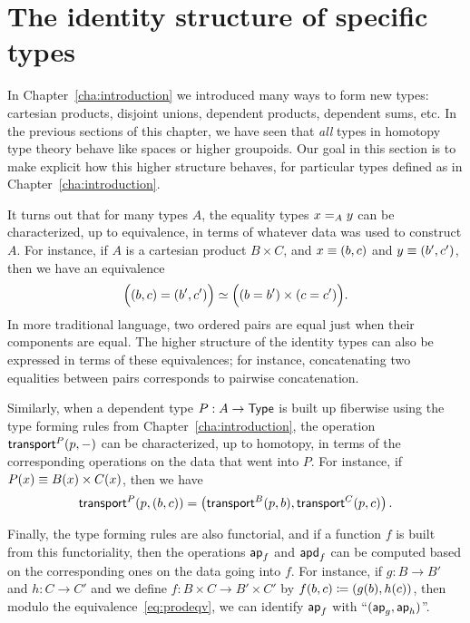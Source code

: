 \newcommand\ua[1]{\ensuremath{\mathsf{ua}} \: #1}

\section{The identity structure of specific types}
\label{sec:computational}

In Chapter~\ref{cha:introduction} we introduced many ways to form new types: cartesian products, disjoint unions, dependent products, dependent sums, etc.
In the previous sections of this chapter, we have seen that \emph{all} types in homotopy type theory behave like spaces or higher groupoids.
Our goal in this section is to make explicit how this higher structure behaves, for particular types defined as in Chapter~\ref{cha:introduction}.

It turns out that for many types $A$, the equality types $\id[A]xy$ can be characterized, up to equivalence, in terms of whatever data was used to construct $A$.
For instance, if $A$ is a cartesian product $B\times C$, and $x\jdeq (b,c)$ and $y\jdeq(b',c')$, then we have an equivalence
\begin{equation}\label{eq:prodeqv}
  \eqv{\Big((b,c)=(b',c')\Big)}{\Big((b=b')\times (c=c')\Big)}.
\end{equation}
In more traditional language, two ordered pairs are equal just when their components are equal.
The higher structure of the identity types can also be expressed in terms of these equivalences; for instance, concatenating two equalities between pairs corresponds to pairwise concatenation.

Similarly, when a dependent type $P:A\to\type$ is built up fiberwise using the type forming rules from Chapter~\ref{cha:introduction}, the operation $\transfib{P}{p}{-}$ can be characterized, up to homotopy, in terms of the corresponding operations on the data that went into $P$.
For instance, if $P(x) \jdeq B(x)\times C(x)$, then we have
\[\transfib{P}{p}{(b,c)} = \left(\transfib{B}{p}{b},\transfib{C}{p}{c}\right).\]

Finally, the type forming rules are also functorial, and if a function $f$ is built from this functoriality, then the operations $\apfunc f$ and $\apdfunc f$ can be computed based on the corresponding ones on the data going into $f$.
For instance, if $g:B\to B'$ and $h:C\to C'$ and we define $f:B\times C \to B'\times C'$ by $f(b,c)\defeq (g(b),h(c))$, then modulo the equivalence~\eqref{eq:prodeqv}, we can identify $\apfunc f$ with ``$(\apfunc g,\apfunc h)$''.

